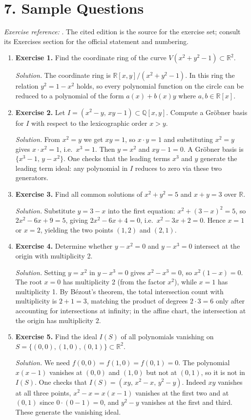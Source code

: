 \section*{7. Sample Questions}
\emph{Exercise reference:} \cite{algebraic_geometry_ref1}. The cited edition is the source for the exercise set; consult its Exercises section for the official statement and numbering.
\begin{enumerate}[leftmargin=*,itemsep=0.9em]

\item \textbf{Exercise 1.} Find the coordinate ring of the curve $V(x^2+y^2-1)\subset\mathbb{R}^2$.

\emph{Solution.} The coordinate ring is $\mathbb{R}[x,y]/(x^2+y^2-1)$. In this ring the relation $y^2=1-x^2$ holds, so every polynomial function on the circle can be reduced to a polynomial of the form $a(x)+b(x)y$ where $a,b\in\mathbb{R}[x]$.

\item \textbf{Exercise 2.} Let $I=(x^2-y,\,xy-1)\subset\mathbb{Q}[x,y]$. Compute a Gr\"obner basis for $I$ with respect to the lexicographic order $x>y$.

\emph{Solution.} From $x^2=y$ we get $xy=1$, so $x\cdot y=1$ and substituting $x^2=y$ gives $x\cdot x^2=1$, i.e.\ $x^3=1$. Then $y=x^2$ and $xy-1=0$. A Gr\"obner basis is $\{x^3-1,\,y-x^2\}$. One checks that the leading terms $x^3$ and $y$ generate the leading term ideal: any polynomial in $I$ reduces to zero via these two generators.

\item \textbf{Exercise 3.} Find all common solutions of $x^2+y^2=5$ and $x+y=3$ over $\mathbb{R}$.

\emph{Solution.} Substitute $y=3-x$ into the first equation: $x^2+(3-x)^2=5$, so $2x^2-6x+9=5$, giving $2x^2-6x+4=0$, i.e.\ $x^2-3x+2=0$. Hence $x=1$ or $x=2$, yielding the two points $(1,2)$ and $(2,1)$.

\item \textbf{Exercise 4.} Determine whether $y-x^2=0$ and $y-x^3=0$ intersect at the origin with multiplicity 2.

\emph{Solution.} Setting $y=x^2$ in $y-x^3=0$ gives $x^2-x^3=0$, so $x^2(1-x)=0$. The root $x=0$ has multiplicity 2 (from the factor $x^2$), while $x=1$ has multiplicity 1. By B\'ezout's theorem, the total intersection count with multiplicity is $2+1=3$, matching the product of degrees $2\cdot 3=6$ only after accounting for intersections at infinity; in the affine chart, the intersection at the origin has multiplicity 2.

\item \textbf{Exercise 5.} Find the ideal $I(S)$ of all polynomials vanishing on $S=\{(0,0),(1,0),(0,1)\}\subset\mathbb{R}^2$.

\emph{Solution.} We need $f(0,0)=f(1,0)=f(0,1)=0$. The polynomial $x(x-1)$ vanishes at $(0,0)$ and $(1,0)$ but not at $(0,1)$, so it is not in $I(S)$. One checks that $I(S)=(xy,\,x^2-x,\,y^2-y)$. Indeed $xy$ vanishes at all three points, $x^2-x=x(x-1)$ vanishes at the first two and at $(0,1)$ since $0\cdot(0-1)=0$, and $y^2-y$ vanishes at the first and third. These generate the vanishing ideal.

\end{enumerate}
